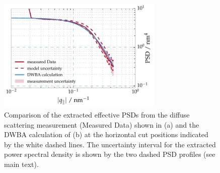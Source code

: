 \begin{figure}[htbp]
  \centering
  \includegraphics[width=0.7\textwidth]{img/CrSc_diffuse_PSD}
  \caption{Comparison of the extracted effective PSDs from the diffuse 
scattering measurement (Measured Data) shown in (a) and the DWBA calculation of 
(b) at the horizontal cut positions indicated by the white dashed lines. The 
uncertainty interval for the extracted power spectral density is shown by the 
two dashed PSD profiles (see main text).}
  \label{fig:diffuse_meas}
\end{figure}


